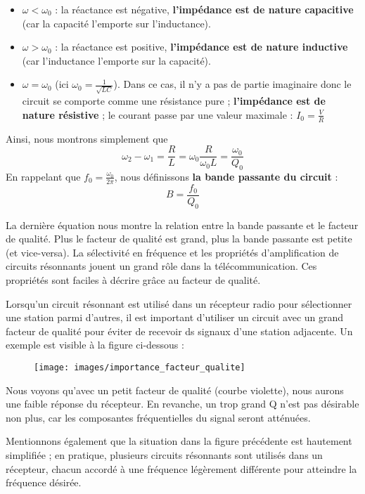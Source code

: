 \documentclass[12pt,a4paper]{article}
\begin{document}
\begin{itemize}
	\item 	$\omega < \omega_0$ : la réactance est négative, \textbf{l'impédance est de nature capacitive} (car la capacité l'emporte sur l'inductance).
	\item 	$\omega > \omega_0$ : la réactance est positive, \textbf{l'impédance est de nature inductive} (car l'inductance l'emporte sur la capacité).
	\item 	$\omega = \omega_0$ (ici $\omega_0 = \frac{1}{\sqrt{LC}}$). Dans ce cas, il n'y a pas de partie imaginaire donc le circuit se comporte comme une résistance pure ; \textbf{l'impédance est de nature résistive} ; le courant passe par une valeur maximale : $I_0 = \frac{V}{R}$
\end{itemize}

Ainsi, nous montrons simplement que 
\begin{equation}
	\omega_2 - \omega_1 = \frac{R}{L} = \omega_0 \frac{R}{\omega_0 L} = \frac{\omega_0}{Q_0}
\end{equation}
En rappelant que $f_0 = \frac{\omega_0}{2\pi}$, nous définissons \textbf{la bande passante du circuit} :
\begin{equation}
	B = \frac{f_0}{Q_0}
\end{equation}

 La dernière équation nous montre la relation entre la bande passante et le facteur de qualité. Plus le facteur de qualité est grand, plus la bande passante est petite (et vice-versa). La sélectivité en fréquence et les propriétés d'amplification de circuits résonnants jouent un grand rôle dans la télécommunication. Ces propriétés sont faciles à décrire grâce au facteur de qualité.
\begin{exemple}
	Lorsqu'un circuit résonnant est utilisé dans un récepteur radio pour sélectionner une station parmi d'autres, il est important d'utiliser un circuit avec un grand facteur de qualité pour éviter de recevoir ds signaux d'une station adjacente. Un exemple est visible à la figure ci-dessous :
\end{exemple}
\begin{figure}[!h]
	\centering
	\texttt{[image: images/importance\_facteur\_qualite]}
\end{figure}
\begin{suiteExemple}
	Nous voyons qu'avec un petit facteur de qualité (courbe violette), nous aurons une faible réponse du récepteur. En revanche, un trop grand Q n'est pas désirable non plus, car les composantes fréquentielles du signal seront atténuées.
	
	Mentionnons également que la situation dans la figure précédente est hautement simplifiée ; en pratique, plusieurs circuits résonnants sont utilisés dans un récepteur, chacun accordé à une fréquence légèrement différente pour atteindre la fréquence désirée.
\end{suiteExemple}
\end{document}
